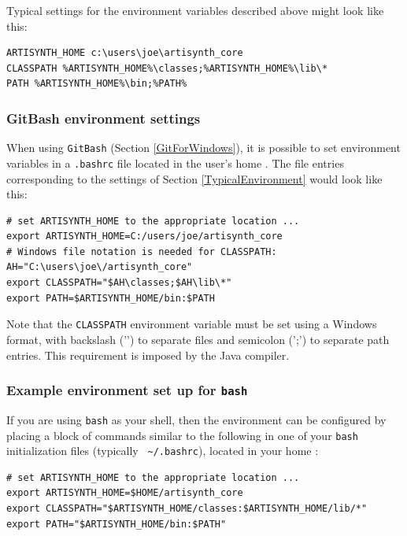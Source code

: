 Typical settings for the environment variables described above might
look like this:

\begin{lstlisting}[]
ARTISYNTH_HOME c:\users\joe\artisynth_core
CLASSPATH %ARTISYNTH_HOME%\classes;%ARTISYNTH_HOME%\lib\*
PATH %ARTISYNTH_HOME%\bin;%PATH%
\end{lstlisting}

\subsubsection{GitBash environment settings}
\label{GitBashEnvironmentSettings}

When using {\tt GitBash} (Section \ref{GitForWindows}), it is
possible to set environment variables in a {\tt .bashrc} file located
in the user's home \directory{}. The file entries corresponding
to the settings of Section \ref{TypicalEnvironment}
would look like this:

\begin{lstlisting}[]
# set ARTISYNTH_HOME to the appropriate location ...
export ARTISYNTH_HOME=C:/users/joe/artisynth_core
# Windows file notation is needed for CLASSPATH:
AH="C:\users\joe\/artisynth_core"
export CLASSPATH="$AH\classes;$AH\lib\*"
export PATH=$ARTISYNTH_HOME/bin:$PATH
\end{lstlisting}

Note that the {\tt CLASSPATH} environment variable must be set using a
Windows format, with backslash ('\BKS') to separate files and
semicolon (';') to separate path entries. This requirement is
imposed by the Java compiler.
\fi %

\ifWindows\else %
\subsubsection{Example environment set up for {\tt bash}}
\label{BashEnvironmentSetup}

If you are using {\tt bash} as your shell, then the environment can be
configured by placing a block of commands similar to the following in
one of your {\tt bash} initialization files (typically {\tt
\textasciitilde/.bashrc}), located in your home \directory{}:

\begin{lstlisting}[]
# set ARTISYNTH_HOME to the appropriate location ...
export ARTISYNTH_HOME=$HOME/artisynth_core
export CLASSPATH="$ARTISYNTH_HOME/classes:$ARTISYNTH_HOME/lib/*"
export PATH="$ARTISYNTH_HOME/bin:$PATH"
\end{lstlisting}

